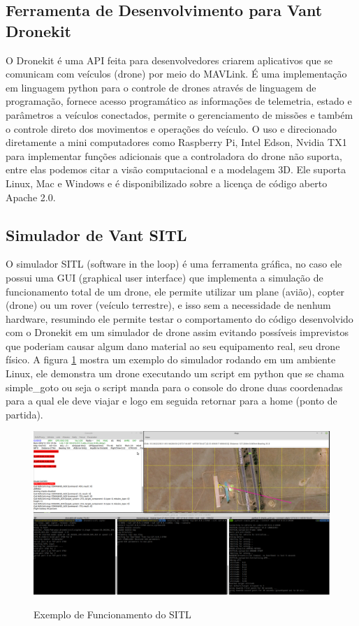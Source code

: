 \subsection{Ferramenta de Desenvolvimento para Vant Dronekit}
O Dronekit é uma API feita para desenvolvedores criarem aplicativos que se comunicam com veículos (drone) por meio do MAVLink. É uma implementação em linguagem python para o controle de drones através de linguagem de programação, fornece acesso programático as informações de telemetria, estado e parâmetros a veículos conectados, permite o gerenciamento de missões e também o controle direto dos movimentos e operações do veículo.
O uso e direcionado diretamente a mini computadores como Raspberry Pi, Intel Edson, Nvidia TX1 para implementar funções adicionais que a controladora do drone não suporta, entre elas podemos citar a visão computacional e a modelagem 3D. Ele suporta Linux, Mac e Windows e é disponibilizado sobre a licença de código aberto Apache 2.0.

\subsection{Simulador de Vant SITL}
O simulador SITL (software in the loop) é uma ferramenta gráfica, no caso ele possui uma GUI (graphical user interface) que implementa a simulação de funcionamento total de um drone, ele permite utilizar um plane (avião), copter (drone) ou um rover (veículo terrestre), e isso sem a necessidade de nenhum hardware, resumindo ele permite testar o comportamento do código desenvolvido com o Dronekit em um simulador de drone assim evitando possíveis imprevistos que poderiam causar algum dano material ao seu equipamento real, seu drone físico. A figura \ref{fig:sitl} mostra um exemplo do simulador rodando em um ambiente Linux, ele demonstra um drone executando um script em python que se chama simple\_goto ou seja o script manda para o console do drone duas coordenadas para a qual ele deve viajar e logo em seguida retornar para a home (ponto de partida).

\begin{figure}[htpb]
  \centering
  \caption{Exemplo de Funcionamento do SITL}
  \includegraphics[scale=.3]{figs/sitl.png}
  \label{fig:sitl}
\end{figure}

